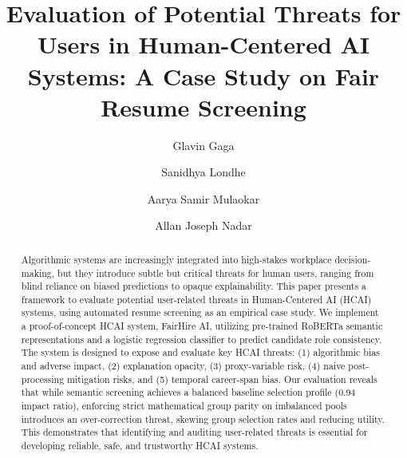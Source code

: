 \documentclass[sigconf]{acmart}
\begin{document}
\title{Evaluation of Potential Threats for Users in Human-Centered AI Systems: A Case Study on Fair Resume Screening}

\author{Glavin Gaga}

\author{Sanidhya Londhe}

\author{Aarya Samir Mulaokar}

\author{Allan Joseph Nadar}

\begin{abstract}
Algorithmic systems are increasingly integrated into high-stakes workplace decision-making, but they introduce subtle but critical threats for human users, ranging from blind reliance on biased predictions to opaque explainability. This paper presents a framework to evaluate potential user-related threats in Human-Centered AI (HCAI) systems, using automated resume screening as an empirical case study. We implement a proof-of-concept HCAI system, FairHire AI, utilizing pre-trained RoBERTa semantic representations and a logistic regression classifier to predict candidate role consistency. The system is designed to expose and evaluate key HCAI threats: (1) algorithmic bias and adverse impact, (2) explanation opacity, (3) proxy-variable risk, (4) naive post-processing mitigation risks, and (5) temporal career-span bias. Our evaluation reveals that while semantic screening achieves a balanced baseline selection profile (0.94 impact ratio), enforcing strict mathematical group parity on imbalanced pools introduces an over-correction threat, skewing group selection rates and reducing utility. This demonstrates that identifying and auditing user-related threats is essential for developing reliable, safe, and trustworthy HCAI systems.
\end{abstract}

\end{document}

